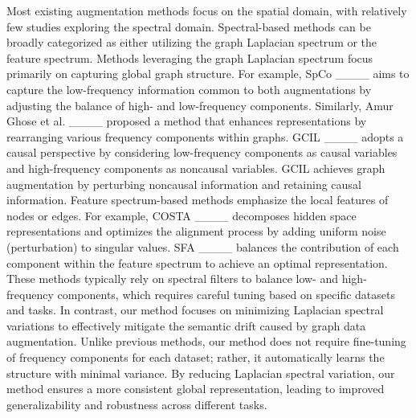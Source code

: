 Most existing augmentation methods focus on the spatial domain, with relatively few studies exploring the spectral domain. Spectral-based methods can be broadly categorized as either utilizing the graph Laplacian spectrum or the feature spectrum. Methods leveraging the graph Laplacian spectrum focus primarily on capturing global graph structure. For example, SpCo ____ aims to capture the low-frequency information common to both augmentations by adjusting the balance of high- and low-frequency components. Similarly, Amur Ghose et al. ____ proposed a method that enhances representations by rearranging various frequency components within graphs. GCIL ____ adopts a causal perspective by considering low-frequency components as causal variables and high-frequency components as noncausal variables. GCIL achieves graph augmentation by perturbing noncausal information and retaining causal information.
Feature spectrum-based methods emphasize the local features of nodes or edges. For example, COSTA ____ decomposes hidden space representations and optimizes the alignment process by adding uniform noise (perturbation) to singular values. SFA ____ balances the contribution of each component within the feature spectrum to achieve an optimal representation. These methods typically rely on spectral filters to balance low- and high-frequency components, which requires careful tuning based on specific datasets and tasks.
In contrast, our method focuses on minimizing Laplacian spectral variations to effectively mitigate the semantic drift caused by graph data augmentation. Unlike previous methods, our method does not require fine-tuning of frequency components for each dataset; rather, it automatically learns the structure with minimal variance. By reducing Laplacian spectral variation, our method ensures a more consistent global representation, leading to improved generalizability and robustness across different tasks.